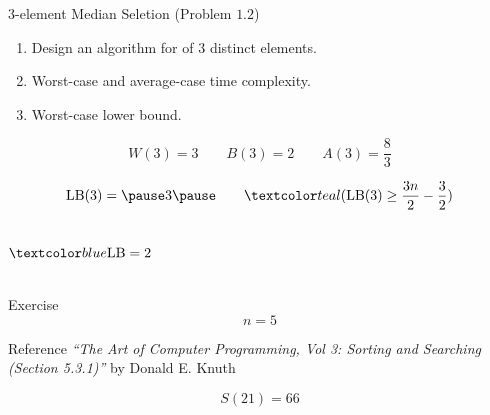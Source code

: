 \begin{frame}{}
  \begin{exampleblock}{$3$-element Median Seletion (Problem $1.2$)}
    \begin{enumerate}[(1)]
      \item Design an algorithm for  of $3$ distinct elements.
      \item Worst-case and average-case time complexity.
      \item Worst-case lower bound.
    \end{enumerate}
  \end{exampleblock}

  \pause

  \pause
  \vspace{-0.30cm}
  \[
    W(3) = 3 \qquad B(3) = 2 \qquad A(3) = \frac{8}{3}
  \]

  \pause
  \vspace{-0.30cm}
  \[
    \text{LB}(3) =\pause 3 \pause \qquad \teal{(\text{LB}(3) \ge \frac{3n}{2} - \frac{3}{2})}
  \]
\end{frame}

\begin{frame}{}
  \begin{columns}
      \[
	\blue{\text{LB} = 2}
      \]
      \pause
      
  \end{columns}

  \pause
  \vspace{0.60cm}
  \centerline{}
\end{frame}

\begin{frame}{}
  \begin{exampleblock}{Exercise}
    \[
      n = 5
    \]
  \end{exampleblock}

  \pause
  \vspace{0.80cm}
  \begin{alertblock}{Reference}
    {\it ``The Art of Computer Programming, Vol 3: Sorting and Searching (Section 5.3.1)''} by Donald E. Knuth
  \end{alertblock}

  \[
    S(21) = 66
  \]
\end{frame}


